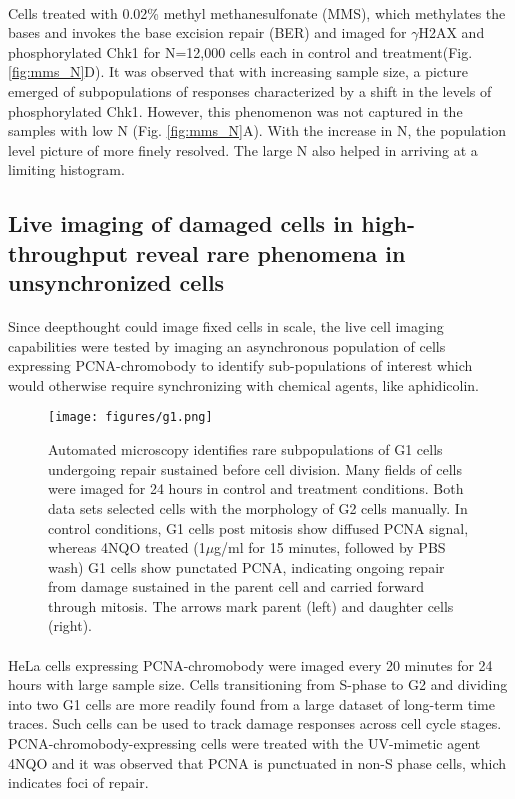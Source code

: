 \paragraph*{}Cells treated with 0.02\% methyl methanesulfonate (MMS), which methylates the bases and invokes the base excision repair (BER) and imaged for $\gamma$H2AX and phosphorylated Chk1 for N=12,000 cells each in control and treatment(Fig. \ref{fig:mms_N}D). It was observed that with increasing sample size, a picture emerged of subpopulations of responses characterized by a shift in the levels of phosphorylated Chk1. However, this phenomenon was not captured in the samples with low N (Fig. \ref{fig:mms_N}A). With the increase in N, the population level picture of more finely resolved. The large N also helped in arriving at a limiting histogram.


\subsection{Live imaging of damaged cells in high-throughput reveal rare phenomena in unsynchronized cells}
\paragraph*{} Since deepthought could image fixed cells in scale, the live cell imaging capabilities were tested by imaging an asynchronous population of cells expressing PCNA-chromobody to identify sub-populations of interest which would otherwise require synchronizing with chemical agents, like aphidicolin.

\begin{figure}[h]
    {\hfill\texttt{[image: figures/g1.png]}\hspace*{\fill}}
    \caption{Automated microscopy identifies rare subpopulations of G1 cells undergoing repair sustained before cell division. Many fields of cells were imaged for 24 hours in control and treatment conditions. Both data sets selected cells with the morphology of G2 cells manually. In control conditions, G1 cells post mitosis show diffused PCNA signal, whereas 4NQO treated (1$\mu$g/ml for 15 minutes, followed by PBS wash) G1 cells show punctated PCNA, indicating ongoing repair from damage sustained in the parent cell and carried forward through mitosis. The arrows mark parent (left) and daughter cells (right). }
    {\label{fig:g1}}
\end{figure}

\paragraph*{} HeLa cells expressing PCNA-chromobody were imaged every 20 minutes for 24 hours with large sample size. Cells transitioning from S-phase to G2 and dividing into two G1 cells are more readily found from a large dataset of long-term time traces. Such cells can be used to track damage responses across cell cycle stages. PCNA-chromobody-expressing cells were treated with the UV-mimetic agent 4NQO and it was observed that PCNA is punctuated in non-S phase cells, which indicates foci of repair. 

